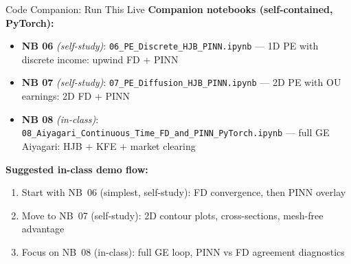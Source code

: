 \documentclass[aspectratio=169,11pt]{beamer}
\begin{document}
\begin{frame}{Code Companion: Run This Live}
\footnotesize
\textbf{Companion notebooks (self-contained, PyTorch):}
\begin{itemize}\itemsep2pt
    \item \textbf{NB 06} \textit{(self-study)}: \texttt{06\_PE\_Discrete\_HJB\_PINN.ipynb} --- 1D PE with discrete income: upwind FD + PINN
    \item \textbf{NB 07} \textit{(self-study)}: \texttt{07\_PE\_Diffusion\_HJB\_PINN.ipynb} --- 2D PE with OU earnings: 2D FD + PINN
    \item \textbf{NB 08} \textit{(in-class)}: \texttt{08\_Aiyagari\_Continuous\_Time\_FD\_and\_PINN\_PyTorch.ipynb} --- full GE Aiyagari: HJB + KFE + market clearing
\end{itemize}

\vspace{0.2em}
\textbf{Suggested in-class demo flow:}
\begin{enumerate}\itemsep1pt
    \item Start with NB~06 (simplest, self-study): FD convergence, then PINN overlay
    \item Move to NB~07 (self-study): 2D contour plots, cross-sections, mesh-free advantage
    \item Focus on NB~08 (in-class): full GE loop, PINN vs FD agreement diagnostics
\end{enumerate}
\end{frame}
\end{document}
